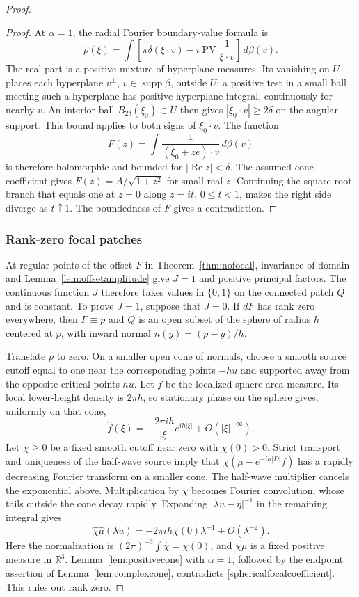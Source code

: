 \documentclass[11pt]{article}
\newcommand{\R}{\mathbb R}
\newcommand{\supp}{\operatorname{supp}}
\newcommand{\dd}{\,d}
\begin{document}
\begin{proof}
\begin{proof}
At $\alpha=1$, the radial Fourier boundary-value formula is
\[
 \widehat\rho(\xi)=\int\left[
 \pi\delta(\xi\cdot v)-i\operatorname{PV}\frac1{\xi\cdot v}
 \right]\dd\beta(v).
\]
The real part is a positive mixture of hyperplane measures. Its vanishing on $U$ places each hyperplane $v^\perp$, $v\in\supp\beta$, outside $U$: a positive test in a small ball meeting such a hyperplane has positive hyperplane integral, continuously for nearby $v$. An interior ball $B_{2\delta}(\xi_0)\subset U$ then gives $|\xi_0\cdot v|\ge2\delta$ on the angular support. This bound applies to both signs of $\xi_0\cdot v$. The function
\[
 F(z)=\int\frac1{(\xi_0+ze)\cdot v}\dd\beta(v)
\]
is therefore holomorphic and bounded for $|\operatorname{Re}z|<\delta$. The assumed cone coefficient gives $F(z)=A/\sqrt{1+z^2}$ for small real $z$. Continuing the square-root branch that equals one at $z=0$ along $z=it$, $0\le t<1$, makes the right side diverge as $t\uparrow1$. The boundedness of $F$ gives a contradiction.
\end{proof}

\subsubsection{Rank-zero focal patches}
At regular points of the offset $F$ in Theorem~\ref{thm:nofocal}, invariance of domain and Lemma~\ref{lem:offsetamplitude} give $J=1$ and positive principal factors. The continuous function $J$ therefore takes values in $\{0,1\}$ on the connected patch $Q$ and is constant. To prove $J=1$, suppose that $J=0$. If $dF$ has rank zero everywhere, then $F\equiv p$ and $Q$ is an open subset of the sphere of radius $h$ centered at $p$, with inward normal $n(y)=(p-y)/h$.

Translate $p$ to zero. On a smaller open cone of normals, choose a smooth source cutoff equal to one near the corresponding points $-hu$ and supported away from the opposite critical points $hu$. Let $f$ be the localized sphere area measure. Its local lower-height density is $2\pi h$, so stationary phase on the sphere gives, uniformly on that cone,
\[
 \widehat f(\xi)=-\frac{2\pi ih}{|\xi|}e^{ih|\xi|}
    +O(|\xi|^{-\infty}).
\]
Let $\chi\ge0$ be a fixed smooth cutoff near zero with $\chi(0)>0$. Strict transport and uniqueness of the half-wave source imply that $\chi(\mu-e^{-ih|D|}f)$ has a rapidly decreasing Fourier transform on a smaller cone. The half-wave multiplier cancels the exponential above. Multiplication by $\chi$ becomes Fourier convolution, whose tails outside the cone decay rapidly. Expanding $|\lambda u-\eta|^{-1}$ in the remaining integral gives
\begin{equation}\label{sphericalfocalcoefficient}
 \widehat{\chi\mu}(\lambda u)
 =-2\pi ih\chi(0)\lambda^{-1}+O(\lambda^{-2}).
\end{equation}
Here the normalization is $(2\pi)^{-3}\int\widehat\chi=\chi(0)$, and $\chi\mu$ is a fixed positive measure in $\R^3$. Lemma~\ref{lem:positivecone} with $\alpha=1$, followed by the endpoint assertion of Lemma~\ref{lem:complexcone}, contradicts \eqref{sphericalfocalcoefficient}. This rules out rank zero.


\end{proof}
\end{document}
